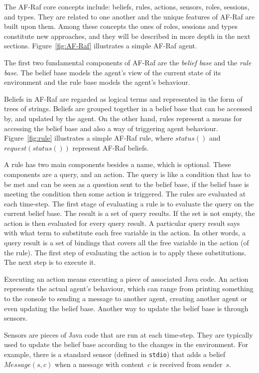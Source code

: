 \documentclass[a4paper,12pt,oneside,fleqn]{book} %
\begin{document}
The AF-Raf core concepts include: beliefs, rules, actions, sensors, roles,
sessions, and types. They are related to one another and the unique
features of AF-Raf are built upon them. Among these concepts the ones of
roles, sessions and types constitute new approaches, and they will be
described in more depth in the next sections. Figure~\ref{fig:AF-Raf}
illustrates a simple AF-Raf agent.

The first two fundamental components of AF-Raf are the \textit{belief base}
and the \textit{rule base}. The belief base models the agent's view of the
current state of its environment and the rule base models the agent's
behaviour.

Beliefs in AF-Raf are regarded as logical terms and represented in the form
of trees of strings. Beliefs are grouped together in a belief base that can
be accessed by, and updated by the agent. On the other hand, rules
represent a means for accessing the belief base and also a way of
triggering agent behaviour. Figure~\ref{fig:rule} illustrates a simple
AF-Raf rule, where $status()$ and $request(status())$ represent AF-Raf
beliefs.

A rule has two main components besides a name, which is optional. These
components are a query, and an action. The query is like a condition that
has to be met and can be seen as a question sent to the belief base, if the
belief base is meeting the condition then some action is triggered. The
rules are evaluated at each time-step. The first stage of evaluating a rule
is to evaluate the query on the current belief base. The result is a set of
query results. If the set is not empty, the action is then evaluated for
every query result. A particular query result says with what term to
substitute each free variable in the action. In other words, a query result
is a set of bindings that covers all the free variable in the action (of
the rule). The first step of evaluating the action is to apply these
substitutions. The next step is to execute it.

Executing an action means executing a piece of associated Java code.
An action represents the actual agent's behaviour, which can
range from printing something to the console to sending a message to
another agent, creating another agent or even updating the belief base.
Another way to update the belief base is through sensors.

Sensors are pieces of Java code that are run at each time-step. They are
typically used to update the belief base according to the changes in the
environment. For example, there is a standard sensor (defined in
\texttt{stdio}) that adds a belief $\mathit{Message}(s,c)$ when a message
with content~$c$ is received from sender~$s$.
\end{document}
